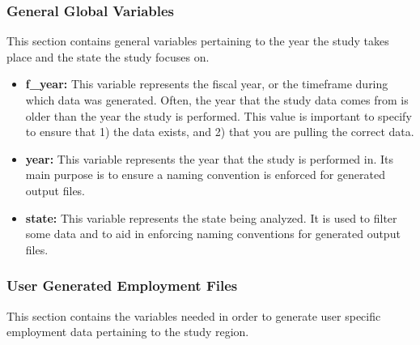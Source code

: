 \documentclass[
]{book}
\providecommand{\tightlist}{%
  \setlength{\itemsep}{0pt}\setlength{\parskip}{0pt}}
\begin{document}
\hypertarget{global}{%
\subsubsection{General Global Variables}\label{global}}

This section contains general variables pertaining to the year the study takes place and the state the study focuses on.

\begin{itemize}
\tightlist
\item
  \textbf{f\_year:} This variable represents the fiscal year, or the timeframe during which data was generated. Often, the year that the study data comes from is older than the year the study is performed. This value is important to specify to ensure that 1) the data exists, and 2) that you are pulling the correct data.\\
\item
  \textbf{year:} This variable represents the year that the study is performed in. Its main purpose is to ensure a naming convention is enforced for generated output files.
\item
  \textbf{state:} This variable represents the state being analyzed. It is used to filter some data and to aid in enforcing naming conventions for generated output files.
\end{itemize}

\hypertarget{generated-employ}{%
\subsubsection{User Generated Employment Files}\label{generated-employ}}

This section contains the variables needed in order to generate user specific employment data pertaining to the study region.
\end{document}
